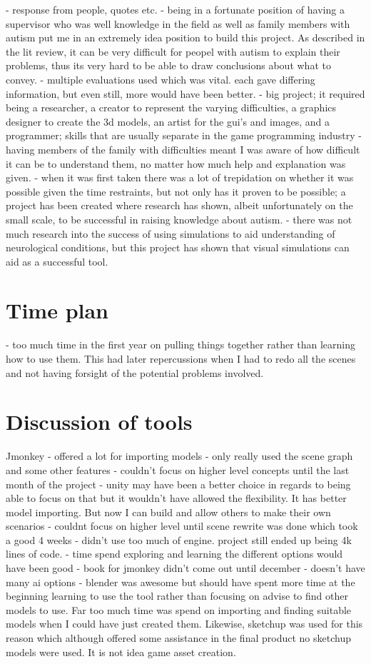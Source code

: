\documentclass[11pt]{report}
\begin{document}
- response from people, quotes etc. 
- being in a fortunate position of having a supervisor who was well knowledge in the field as well as family members with autism put me in an extremely idea position to build this project. As described in the lit review, it can be very difficult for peopel with autism to explain their problems, thus its very hard to be able to draw conclusions about what to convey.
- multiple evaluations used which was vital. each gave differing information, but even still, more would have been better. 
- big project; it required being a researcher, a creator to represent the varying difficulties, a graphics designer to create the 3d models, an artist for the gui's and images, and a programmer; skills that are usually separate in the game programming industry
- having members of the family with difficulties meant I was aware of how difficult it can be to understand them, no matter how much help and explanation was given. 
- when it was first taken there was a lot of trepidation on whether it was possible given the time restraints, but not only has it proven to be possible; a project has been created where research has shown, albeit unfortunately on the small scale, to be successful in raising knowledge about autism. 
- there was not much research into the success of using simulations to aid understanding of neurological conditions, but this project has shown that visual simulations can aid as a successful tool. 

\section{Time plan}
- too much time in the first year on pulling things together rather than learning how to use them. This had later repercussions when I had to redo all the scenes and not having forsight of the potential problems involved.

\section{Discussion of tools}
Jmonkey
- offered a lot for importing models
- only really used the scene graph and some other features
- couldn't focus on higher level concepts until the last month of the project
- unity may have been a better choice in regards to being able to focus on that but it wouldn't have allowed the flexibility. It has better model importing. But now I can build and allow others to make their own scenarios
- couldnt focus on higher level until scene rewrite was done which took a good 4 weeks
- didn't use too much of engine. project still ended up being 4k lines of code.
- time spend exploring and learning the different options would have been good
- book for jmonkey didn't come out until december
- doesn't have many ai options
- blender was awesome but should have spent more time at the beginning learning to use the tool rather than focusing on advise to find other models to use. Far too much time was spend on importing and finding suitable models when I could have just created them. Likewise, sketchup was used for this reason which although offered some assistance in the final product no sketchup models were used. It is not idea game asset creation.
\end{document}
